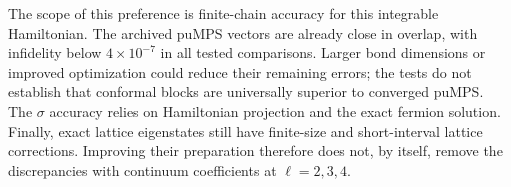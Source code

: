 The scope of this preference is finite-chain accuracy for this integrable
Hamiltonian. The archived puMPS vectors are already close in overlap,
with infidelity below $4\times10^{-7}$ in all tested comparisons.
Larger bond dimensions or improved optimization could reduce their
remaining errors; the tests do not establish that conformal blocks are
universally superior to converged puMPS. The $\sigma$ accuracy relies on
Hamiltonian projection and the exact fermion solution. Finally, exact
lattice eigenstates still have finite-size and short-interval lattice
corrections. Improving their preparation therefore does not, by itself,
remove the discrepancies with continuum coefficients at $\ell=2,3,4$.
